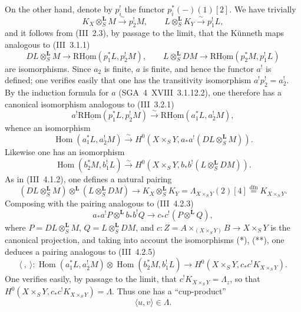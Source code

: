 \documentclass[11pt]{article}
\DeclareMathOperator{\Hom}{Hom}
\providecommand{\LL}{\mathbf L}
\providecommand{\Hom}{\operatorname{Hom}}
\providecommand{\Hom}{\operatorname{Hom}}
\begin{document}
On the other hand, denote by $p_i^!$ the functor $p_i^*(-)(1)[2]$. We have trivially
\[
K_X\otimes_S^{\LL}M\xrightarrow{\sim}p_2^!M,
\qquad
L\otimes_S^{\LL}K_Y\xrightarrow{\sim}p_1^!L,
\]
and it follows from (III~2.3), by passage to the limit, that the Künneth maps analogous to (III~3.1.1)
\[
DL\otimes_S^{\LL}M\longrightarrow \mathrm{R}\underline{\mathrm{Hom}}(p_1^*L,p_2^!M),
\qquad
L\otimes_S^{\LL}DM\longrightarrow \mathrm{R}\underline{\mathrm{Hom}}(p_2^*M,p_1^!L)
\]
are isomorphisms. Since $a_2$ is finite, $a$ is finite, and hence the functor $a^!$ is defined; one verifies easily that one has the transitivity isomorphism $a^!p_2^!=a_2^!$. By the induction formula for $a$ (SGA~4~XVIII~3.1.12.2), one therefore has a canonical isomorphism analogous to (III~3.2.1)
\[
a^!\mathrm{R}\underline{\mathrm{Hom}}(p_1^*L,p_2^!M)\xrightarrow{\sim}\mathrm{R}\underline{\mathrm{Hom}}(a_1^*L,a_2^!M),
\]
whence an isomorphism
\begin{equation}\tag{*}
\Hom(a_1^*L,a_2^!M)\xrightarrow{\sim}H^0(X\times_S Y,a_*a^!(DL\otimes_S^{\LL}M)).
\end{equation}
Likewise one has an isomorphism
\begin{equation}\tag{**}
\Hom(b_2^*M,b_1^!L)\xrightarrow{\sim}H^0(X\times_S Y,b_*b^!(L\otimes_S^{\LL}DM)).
\end{equation}
As in (III~4.1.2), one defines a natural pairing
\[
(DL\otimes_S^{\LL}M)\otimes^{\LL}(L\otimes_S^{\LL}DM)
\longrightarrow K_X\otimes_S^{\LL}K_Y=\Lambda_{X\times_S Y}(2)[4]\stackrel{\mathrm{dfn}}{=}K_{X\times_S Y}.
\]
Composing with the pairing analogous to (III~4.2.3)
\[
a_*a^!P\otimes^{\LL} b_*b^!Q\longrightarrow c_*c^!(P\otimes^{\LL}Q),
\]
where $P=DL\otimes_S^{\LL}M$, $Q=L\otimes_S^{\LL}DM$, and $c:Z=A\times_{(X\times_S Y)}B\to X\times_S Y$ is the canonical projection, and taking into account the isomorphisms (*), (**), one deduces a pairing analogous to (III~4.2.5)
\[
\langle\ ,\ \rangle:\Hom(a_1^*L,a_2^!M)\otimes\Hom(b_2^*M,b_1^!L)
\longrightarrow H^0(X\times_S Y,c_*c^!K_{X\times_S Y}).
\]
One verifies easily, by passage to the limit, that $c^!K_{X\times_S Y}=\Lambda_z$, so that $H^0(X\times_S Y,c_*c^!K_{X\times_S Y})=\Lambda$. Thus one has a ``cup-product''
\begin{equation}\tag{1.1.2}
\langle u,v\rangle\in\Lambda.
\end{equation}
\end{document}
